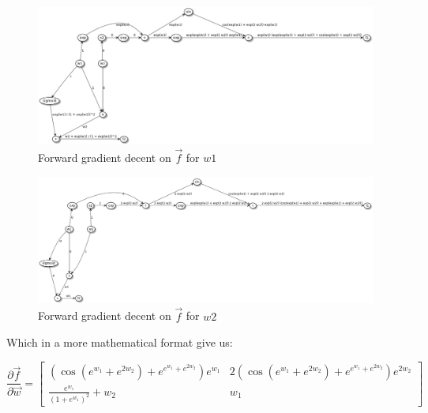 

\begin{figure}[h!]
    \begin{center}
        \includegraphics[width=.95\textwidth]{../2_automatocDifferentiation/computation_graph_forward_w1.png}
        \caption{Forward gradient decent on $\vec{f}$ for $w1$}
    \end{center}
\end{figure}

\begin{figure}[h!]
    \begin{center}
        \includegraphics[width=.95\textwidth]{../2_automatocDifferentiation/computation_graph_forward_w2.png}
        \caption{Forward gradient decent on $\vec{f}$ for $w2$}
    \end{center}
\end{figure}

Which in a more mathematical format give us:

\[
    \frac{\partial \vec{f}}{\partial \vec{w}} =
    \begin{bmatrix}
        ( \cos(e^{w_1} + e^{2 w_2}) + e^{e^{w_1} + e^{2 w_2}} ) e^{w_1}   &   2 ( \cos(e^{w_1} + e^{2 w_2}) + e^{e^{w_1} + e^{2 w_2}} ) e^{2 w_2} \\
        \frac{e^{w_1}}{(1 + e^{w_1})^2} + w_2                             &   w_1
    \end{bmatrix}
\]

